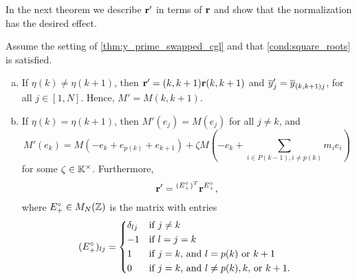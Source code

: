 In the next theorem we describe $\mathbf{r}'$ in terms of $\mathbf{r}$ and show that the
normalization has the desired effect.

\begin{theorem}\label{thm:almost_mutation_toric_frame}

	Assume the setting of \cref{thm:y_prime_swapped_cgl} and that \cref{cond:square_roots}
	is satisfied.
	\begin{enumerate}[(a)]
		\item If $\eta(k) \neq \eta(k+1)$, then $\mathbf{r}' = (k, k+1)\mathbf{r} (k, k+1)$ and $\overline{y}'_j =
			      \overline{y}_{(k, k+1)j}$, for all $j \in [1, N]$. Hence, $M' = M(k, k+1)$.
		\item If $\eta(k) = \eta(k+1)$, then $M'(e_j) = M(e_j)$ for all $j \neq k$, and
		      \begin{equation}\label{eq:M'_of_ek}
			      M'(e_k) = M(-e_k + e_{p(k)} + e_{k+1}) + \zeta M\left(-e_k + \sum_{i \in P(k-1), i\neq p(k)}m_ie_i\right)
		      \end{equation}
		      for some $\zeta \in \mathbb{K}^\times$. Furthermore,
		      \begin{equation*}
			      \mathbf{r}' = \prescript{(E_{+}^\circ)^T}{}{\mathbf{r}}^{E^\circ_{+}},
		      \end{equation*}
		      where $E^\circ_{+}\in M_N(\mathbb{Z})$ is the matrix with entries
		      \begin{equation*}
			      (E^\circ_{+})_{lj} = \begin{dcases*}
				      \delta_{lj} & if $j \neq k$                               \\
				      -1          & if $l = j = k$                              \\
				      1           & if $j=k$, and $l= p(k)$ or $k+1$            \\
				      0           & if $j = k$, and $l \neq p(k), k,$ or $k+1$.
			      \end{dcases*}
		      \end{equation*}
	\end{enumerate}
\end{theorem}
